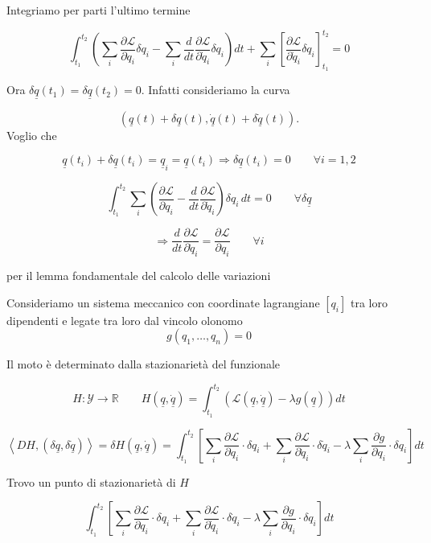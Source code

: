 Integriamo per parti l'ultimo termine

\[
\int_{t_1}^{t_2}
\left(
\sum_i \frac{\partial \mathcal{L}}{\partial q_i}\delta q_i
-
\sum_i \frac{d}{dt}\frac{\partial \mathcal{L}}{\partial \dot{q}_i}\delta q_i
\right)dt
+
\sum_i
\left[
\frac{\partial \mathcal{L}}{\partial \dot{q}_i}\delta q_i
\right]_{t_1}^{t_2}
=0
\]

Ora \(\delta\underline{q}(t_1)=\delta\underline{q}(t_2)=0\). Infatti consideriamo la curva

\[
(\underline{q}(t)+\delta\underline{q}(t),\dot{\underline{q}}(t)+\delta\dot{\underline{q}}(t)).
\]
Voglio che

\[
\underline{q}(t_i)+\delta\underline{q}(t_i)
=
\underline{q}_i
=
\underline{q}(t_i)
\Rightarrow
\delta\underline{q}(t_i)=0
\qquad
\forall i=1,2
\]

\[
\int_{t_1}^{t_2}
\sum_i
\left(
\frac{\partial \mathcal{L}}{\partial q_i}
-
\frac{d}{dt}\frac{\partial \mathcal{L}}{\partial \dot{q}_i}
\right)
\delta q_i\,dt
=0
\qquad
\forall \delta\underline{q}
\]

\[
\Rightarrow
\frac{d}{dt}\frac{\partial \mathcal{L}}{\partial \dot{q}_i}
=
\frac{\partial \mathcal{L}}{\partial q_i}
\qquad
\forall i
\]

per il lemma fondamentale del calcolo delle variazioni

Consideriamo un sistema meccanico con coordinate lagrangiane \([q_i]\) tra loro dipendenti e legate tra loro dal vincolo olonomo
\[
g(q_1,\ldots,q_n)=0
\]

Il moto è determinato dalla stazionarietà del funzionale

\[
H:\mathcal{Y}\to\mathbb{R}
\qquad
H(\underline{q},\dot{\underline{q}})
=
\int_{t_1}^{t_2}
\left(
\mathcal{L}(\underline{q},\dot{\underline{q}})
-
\lambda g(\underline{q})
\right)dt
\]

\[
\left\langle DH,(\delta\underline{q},\delta\dot{\underline{q}})\right\rangle
=
\delta H(\underline{q},\dot{\underline{q}})
=
\int_{t_1}^{t_2}
\left[
\sum_i \frac{\partial \mathcal{L}}{\partial q_i}\cdot \delta q_i
+
\sum_i \frac{\partial \mathcal{L}}{\partial \dot{q}_i}\cdot \delta\dot{q}_i
-
\lambda\sum_i \frac{\partial g}{\partial q_i}\cdot \delta q_i
\right]dt
\]

Trovo un punto di stazionarietà di \(H\)

\[
\int_{t_1}^{t_2}
\left[
\sum_i \frac{\partial \mathcal{L}}{\partial q_i}\cdot \delta q_i
+
\sum_i \frac{\partial \mathcal{L}}{\partial \dot{q}_i}\cdot \delta\dot{q}_i
-
\lambda\sum_i \frac{\partial g}{\partial q_i}\cdot \delta q_i
\right]dt
\]

